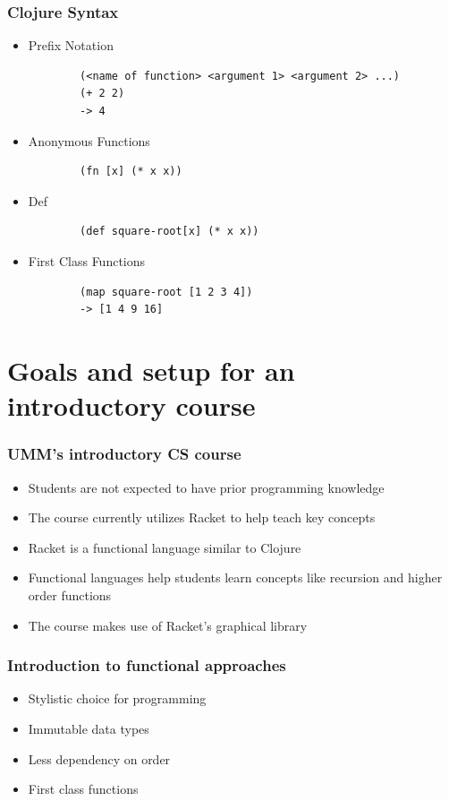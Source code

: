 \documentclass{beamer}
\begin{document}
\begin{frame}[fragile]
\frametitle{Clojure Syntax}
\begin{itemize}
	\item Prefix Notation			
	\begin{verbatim}
		(<name of function> <argument 1> <argument 2> ...)
		(+ 2 2)
		-> 4
	\end{verbatim}
	\item Anonymous Functions
	\begin{verbatim}
		(fn [x] (* x x))
	\end{verbatim}
	\item Def
	\begin{verbatim}
		(def square-root[x] (* x x))
	\end{verbatim}
	\item First Class Functions
	\begin{verbatim}
		(map square-root [1 2 3 4])
		-> [1 4 9 16]
	\end{verbatim}
\end{itemize}
\end{frame}

\section{Goals and setup for an introductory course}

\begin{frame}
\frametitle{UMM's introductory CS course}
\begin{itemize}
\item Students are not expected to have prior programming knowledge
\item The course currently utilizes Racket to help teach key concepts
\item Racket is a functional language similar to Clojure
\item Functional languages help students learn concepts like recursion and higher order functions
\item The course makes use of Racket's graphical library 
\end{itemize}
\end{frame}

\begin{frame}
\frametitle{Introduction to functional approaches}
\begin{itemize}
\item Stylistic choice for programming
\item Immutable data types
\item Less dependency on order
\item First class functions
\end{itemize}
\end{frame}
\end{document}
